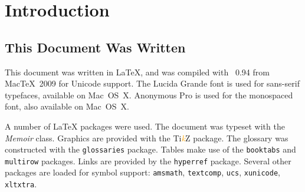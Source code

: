 \chapter{Introduction}

\section{This Document Was Written}
\label{sec:intro:how}
\newcommand*{\TikZ}{Ti\textcolor{orange}{\emph{k}}Z}
This document was written in \LaTeX, and was compiled with \XeTeX~0.94 from Mac\TeX\ 2009 for Unicode support.  The Lucida Grande font is used for sans-serif typefaces, available on Mac~OS~X.
Anonymous Pro is used for the monospaced font, also available on Mac~OS~X.

A number of \LaTeX{} packages were used.
The document was typeset with the \textit{Memoir} class.
Graphics are provided with the {\TikZ} package.
The glossary was constructed with the \texttt{glossaries} package.
Tables make use of the \texttt{booktabs} and \texttt{multirow} packages.
Links are provided by the \texttt{hyperref} package.
Several other packages are loaded for symbol support: \texttt{amsmath},
    \texttt{textcomp}, \texttt{ucs}, \texttt{xunicode}, \texttt{xltxtra}.


